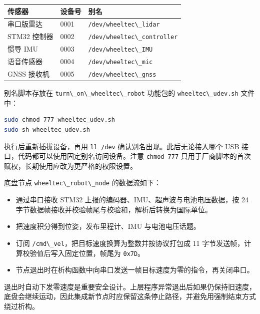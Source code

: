 \begin{longtable}[]{@{}lll@{}}
\toprule\noalign{}
传感器 & 设备号 & 别名 \\
\midrule\noalign{}
\endhead
\bottomrule\noalign{}
\endlastfoot
串口版雷达 & 0001 & \passthrough{\lstinline!/dev/wheeltec\_lidar!} \\
STM32 控制器 & 0002 &
\passthrough{\lstinline!/dev/wheeltec\_controller!} \\
惯导 IMU & 0003 & \passthrough{\lstinline!/dev/wheeltec\_IMU!} \\
语音传感器 & 0004 & \passthrough{\lstinline!/dev/wheeltec\_mic!} \\
GNSS 接收机 & 0005 & \passthrough{\lstinline!/dev/wheeltec\_gnss!} \\
\end{longtable}

别名脚本存放在 \passthrough{\lstinline!turn\_on\_wheeltec\_robot!}
功能包的 \passthrough{\lstinline!wheeltec\_udev.sh!} 文件中：

\begin{lstlisting}[language=bash]
sudo chmod 777 wheeltec_udev.sh
sudo sh wheeltec_udev.sh
\end{lstlisting}

执行后重新插拔设备，再用 \passthrough{\lstinline!ll /dev!}
确认别名出现。此后无论接入哪个 USB
接口，代码都可以使用固定别名访问设备。注意
\passthrough{\lstinline!chmod 777!}
只用于厂商脚本的首次赋权，长期使用应改为更严格的权限设置。

底盘节点 \passthrough{\lstinline!wheeltec\_robot\_node!} 的数据流如下：

\begin{itemize}
\tightlist
\item
  通过串口接收 STM32 上报的编码器、IMU、超声波与电池电压数据，按 24
  字节数据帧接收并校验帧尾与校验和，解析后转换为国际单位。
\item
  把速度积分得到位姿，发布里程计、IMU 与电池电压话题。
\item
  订阅
  \passthrough{\lstinline!/cmd\_vel!}，把目标速度换算为整数并按协议打包成
  11 字节发送帧，计算校验值后写入固定位置，帧尾为
  \passthrough{\lstinline!0x7D!}。
\item
  节点退出时在析构函数中向串口发送一帧目标速度为零的指令，再关闭串口。
\end{itemize}

退出时自动下发零速度是重要安全设计。上层程序异常退出后如果仍保持旧速度，底盘会继续运动，因此集成新节点时应保留这条停止路径，并避免用强制结束方式绕过析构。

